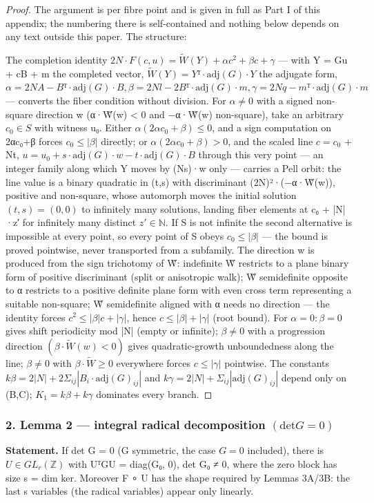 \begin{proof}
The argument is per fibre point and is given in full as Part I of this appendix; the numbering there is self-contained and nothing below depends on any text outside this paper. The structure:

The completion identity $2N·F(c,u) = \tilde{W}(Y) + αc^{2} + βc + γ$ — with Y = Gu + cB + m the completed vector, $\tilde{W}(Y) = Yᵀ·\mathrm{adj}(G)·Y$ the adjugate form, $α = 2NA − Bᵀ·\mathrm{adj}(G)·B, β = 2Nl − 2Bᵀ·\mathrm{adj}(G)·m, γ = 2Nq − mᵀ·\mathrm{adj}(G)·m$ — converts the fiber condition without division. For $α ≠ 0$ with a signed non-square direction w (α·W̃(w) < 0 and −α·W̃(w) non-square), take an arbitrary $c_{0} ∈ S$ with witness u₀. Either $α(2αc_{0}+β) ≤ 0$, and a sign computation on 2αc₀+β forces $c_{0} ≤ |β|$ directly; or $α(2αc_{0}+β) > 0$, and the scaled line $c = c_{0}$ + Nt, $u = u_{0} + s·\mathrm{adj}(G)·w − t·\mathrm{adj}(G)·B$ through this very point — an integer family along which Y moves by (Ns)·w only — carries a Pell orbit: the line value is a binary quadratic in (t,s) with discriminant (2N)²·(−α·W̃(w)), positive and non-square, whose automorph moves the initial solution $(t,s) = (0,0)$ to infinitely many solutions, landing fiber elements at c₀ + |N|·z′ for infinitely many distinct $z′ ∈ ℕ$. If S is not infinite the second alternative is impossible at every point, so every point of S obeys $c_{0} ≤ |β|$ — the bound is proved pointwise, never transported from a subfamily. The direction w is produced from the sign trichotomy of W̃: indefinite W̃ restricts to a plane binary form of positive discriminant (split or anisotropic walk); W̃ semidefinite opposite to α restricts to a positive definite plane form with even cross term representing a suitable non-square; W̃ semidefinite aligned with α needs no direction — the identity forces $c^{2} ≤ |β|c + |γ|$, hence $c ≤ |β| + |γ|$ (root bound). For $α = 0: β = 0$ gives shift periodicity mod |N| (empty or infinite); $β ≠ 0$ with a progression direction $(β·\tilde{W}(w) < 0)$ gives quadratic-growth unboundedness along the line; $β ≠ 0$ with $β·\tilde{W} ≥ 0$ everywhere forces $c ≤ |γ|$ pointwise. The constants $kβ = 2|N| + 2Σ_{ij}|B_{i}·\mathrm{adj}(G)_{ij}|$ and $kγ = 2|N| + Σ_{ij}|\mathrm{adj}(G)_{ij}|$ depend only on (B,C); $K_{1} = kβ + kγ$ dominates every branch.

\end{proof}
\subsubsection*{2. Lemma 2 — integral radical decomposition $(\mathrm{det} G = 0)$}
\textbf{Statement.} If det G = 0 (G symmetric, the case $G = 0$ included), there is $U ∈ GL_{r}(ℤ)$ with UᵀGU = diag(G₀, 0), det G₀ ≠ 0, where the zero block has size s = dim ker. Moreover F ∘ U has the shape required by Lemmas 3A/3B: the last s variables (the radical variables) appear only linearly.

